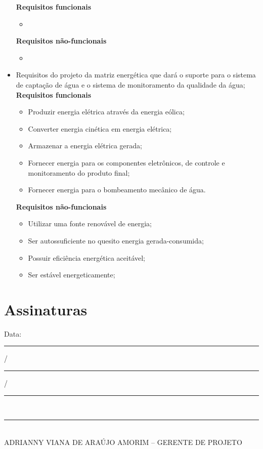 \begin{itemize}
	\textbf{Requisitos funcionais}
	\begin{itemize}
	  \item 
	\end{itemize}
	
	\textbf{Requisitos não-funcionais}
	\begin{itemize}
	  \item 
	\end{itemize}
      
      \item Requisitos do projeto da matriz energética que dará o suporte para o sistema de captação de água e o sistema de monitoramento da qualidade da água;\\
      
	\textbf{Requisitos funcionais}
	\begin{itemize}
	  \item Produzir energia elétrica através da energia eólica;
	  \item Converter energia cinética em energia elétrica;
	  \item Armazenar a energia elétrica gerada;
	  \item Fornecer energia para os componentes eletrônicos, de controle e monitoramento do produto final;
	  \item Fornecer energia para o bombeamento mecânico de água.
	\end{itemize}
	
	\textbf{Requisitos não-funcionais}
	\begin{itemize}
	  \item Utilizar uma fonte renovável de energia;
	  \item Ser autossuficiente no quesito energia gerada-consumida;
	  \item Possuir eficiência energética aceitável;
	  \item Ser estável energeticamente;
	\end{itemize}
	
    \end{itemize}
  
\section*{Assinaturas}

  \begin{center}
  Data: \rule{0.5cm}{0.1mm}/\rule{0.5cm}{0.1mm}/\rule{1cm}{0.1mm}     \\
  \rule{13cm}{0.1mm}\\
  ADRIANNY VIANA DE ARAÚJO AMORIM – GERENTE DE PROJETO\\


\end{center}
% 